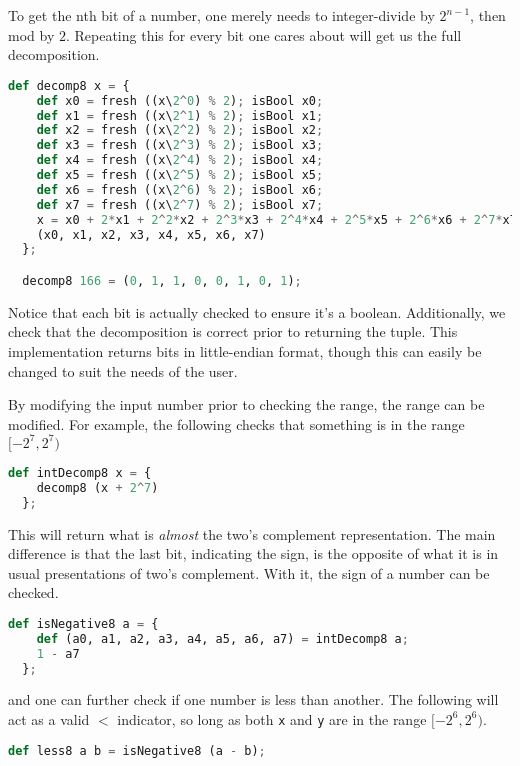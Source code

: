 To get the nth bit of a number, one merely needs to integer-divide by $2^{n-1}$, then mod by $2$. Repeating this for every bit one cares about will get us the full decomposition.

\begin{lstlisting}[language=Python]
  def decomp8 x = {
    def x0 = fresh ((x\2^0) % 2); isBool x0;
    def x1 = fresh ((x\2^1) % 2); isBool x1;
    def x2 = fresh ((x\2^2) % 2); isBool x2;
    def x3 = fresh ((x\2^3) % 2); isBool x3;
    def x4 = fresh ((x\2^4) % 2); isBool x4;
    def x5 = fresh ((x\2^5) % 2); isBool x5;
    def x6 = fresh ((x\2^6) % 2); isBool x6;
    def x7 = fresh ((x\2^7) % 2); isBool x7;
    x = x0 + 2*x1 + 2^2*x2 + 2^3*x3 + 2^4*x4 + 2^5*x5 + 2^6*x6 + 2^7*x7;
    (x0, x1, x2, x3, x4, x5, x6, x7)
  };

  decomp8 166 = (0, 1, 1, 0, 0, 1, 0, 1);
\end{lstlisting}

Notice that each bit is actually checked to ensure it's a boolean. Additionally, we check that the decomposition is correct prior to returning the tuple. This implementation returns bits in little-endian format, though this can easily be changed to suit the needs of the user.

By modifying the input number prior to checking the range, the range can be modified. For example, the following checks that something is in the range $[-2^7, 2^7)$

\begin{lstlisting}[language=Python]
  def intDecomp8 x = {
    decomp8 (x + 2^7)
  };
\end{lstlisting}

This will return what is \textit{almost} the two's complement representation. The main difference is that the last bit, indicating the sign, is the opposite of what it is in usual presentations of two's complement. With it, the sign of a number can be checked.

\begin{lstlisting}[language=Python]
  def isNegative8 a = {
    def (a0, a1, a2, a3, a4, a5, a6, a7) = intDecomp8 a;
    1 - a7
  };
\end{lstlisting}

and one can further check if one number is less than another. The following will act as a valid $<$ indicator, so long as both \lstinline{x} and \lstinline{y} are in the range $[-2^6, 2^6)$.

\begin{lstlisting}[language=Python]
  def less8 a b = isNegative8 (a - b);
\end{lstlisting}

